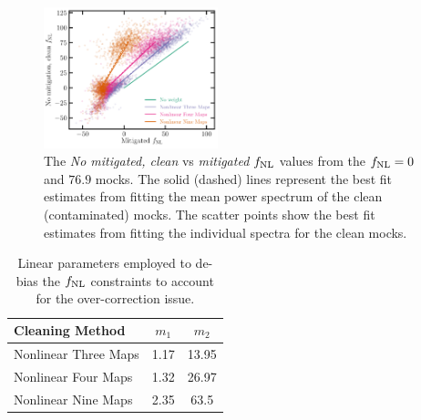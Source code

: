 \begin{figure}
\centering
\includegraphics[width=0.45\textwidth]{figures/fnlbias}
\caption{The \textit{No mitigated, clean} vs \textit{mitigated} $f_{\rm NL}$ values from the $f_{\rm NL}=0$ and $76.9$ mocks. The solid (dashed) lines represent the best fit estimates from fitting the mean power spectrum of the clean (contaminated) mocks. The scatter points show the best fit estimates from fitting the individual spectra for the clean mocks.}\label{fig:fnlbias}
\end{figure}



\begin{table}
\begin{center}
\caption{Linear parameters employed to de-bias the $f_{\rm NL}$ constraints to account for the over-correction issue.}\label{tab:debiasparams}
\begin{tabular}{lcc}
\hline
\hline
\textbf{Cleaning Method} & $m_{1}$ & $m_{2}$ \\
\hline
Nonlinear Three Maps & 1.17 & 13.95 \\
Nonlinear Four Maps & 1.32 & 26.97 \\
Nonlinear Nine Maps & 2.35 & 63.5\\
\hline
\end{tabular}
\end{center}
\end{table}


